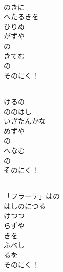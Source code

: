\documentclass[10pt,b5j]{tarticle} %
\begin{document}
\vspace{1.5em} %
\newcommand{\linespace}{0.5em} %
\newcommand{\blocksize}{0.5\hsize} %
\newcommand{\itemmargin}{6em} %
\begin{enumerate} %
    \setlength{\itemindent}{\itemmargin} %
    \begin{minipage}[c]{\blocksize}
    
        \vspace{\linespace}
        \item~\\
        のきに\\
        へたるきを\\
        ひりぬ\\
        がずや\\
        の\\
        きてむ\\
        の\\
        そのにく！
        
        \vspace{\linespace}
        \item~\\
        けるの\\
        ののはし\\
        いざたんかな\\
        めずや\\
        の\\
        へなむ\\
        の\\
        そのにく！
        
        \vspace{\linespace}
        \item~\\
        「フラーテ」はの\\
        はしのにつる\\
        けつつ\\
        らずや\\
        きを\\
        ふべし\\
        るを\\
        そのにく！
    
    \end{minipage}
\end{enumerate} %
\end{document}
